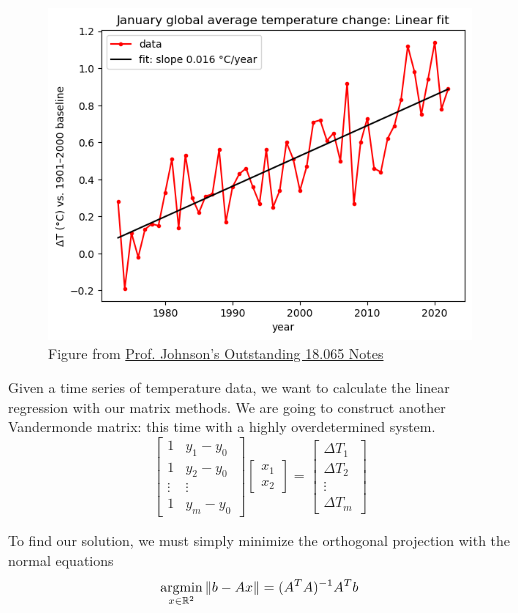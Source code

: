 \documentclass[11pt]{article}
\begin{document}
\begin{examplebox}
		\begin{figure}
		\includegraphics[width=\linewidth]{figs/linreg.png}
		\footnotesize \centering Figure from \href{https://github.com/mitmath/18065/blob/main/notes/Least-Square%20Fitting.ipynb}{Prof. Johnson's Outstanding 18.065 Notes}
    \end{figure}
	\nident Given a time series of temperature data, we want to calculate the linear regression with our matrix methods. We are going to construct another Vandermonde matrix: this time with a highly overdetermined system. 
	$$\begin{bmatrix}
	  1 & y_1 - y_0\\
	1 & y_2 - y_0\\
	\vdots & \vdots\\
	1 & y_m - y_0
	\end{bmatrix}\begin{bmatrix}
	  x_1 \\
	x_2
	\end{bmatrix}
	= \begin{bmatrix}
	  \Delta T_1\\
	\Delta T_2\\
	\vdots\\
	\Delta T_m
	\end{bmatrix}$$

	To find our solution, we must simply minimize the orthogonal projection with the normal equations
	$$\displaystyle \operatorname*{argmin}_{x \in \mathbb{R}^{2}} \|b-Ax\| = (A^{T}A)^{-1}A^{T}b$$
\end{examplebox}
	\vspace{0.5cm}
\end{document}
